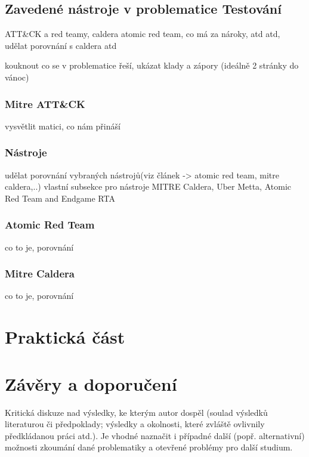 \subsection{Zavedené nástroje v problematice Testování}

ATT\&CK a red teamy, caldera
atomic red team, co má za nároky, atd atd, udělat porovnání s caldera atd



kouknout co se v problematice řeší, ukázat klady a zápory (ideálně 2 stránky do vánoc)

\subsubsection{Mitre ATT\&CK}
vysvětlit matici, co nám přináší

\subsubsection{Nástroje}

udělat porovnání vybraných nástrojů(viz článek -> atomic red team, mitre caldera,..)
vlastní subsekce pro nástroje
MITRE Caldera, Uber Metta, Atomic Red Team and Endgame RTA

\subsubsection{Atomic Red Team}
co to je, porovnání

\subsubsection{Mitre Caldera}
co to je, porovnání


\section{Praktická část}


\section{Závěry a doporučení}


Kritická diskuze nad výsledky, ke kterým autor dospěl (soulad výsledků  literaturou či předpoklady;
výsledky a okolnosti, které zvláště ovlivnily předkládanou práci atd.).
Je vhodné naznačit i případné další
(popř. alternativní) možnosti zkoumání dané problematiky a otevřené problémy pro další studium.

